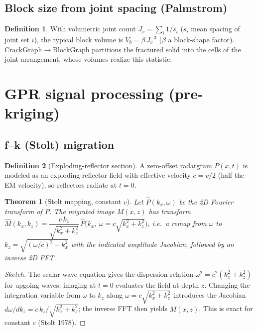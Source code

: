 \documentclass[11pt]{article}
\theoremstyle{definition}\newtheorem{definition}{Definition}[section]
\theoremstyle{plain}\newtheorem{theorem}{Theorem}[section]
\begin{document}
\subsection{Block size from joint spacing (Palmstrom)}
\begin{definition}
With volumetric joint count $J_v=\sum_i 1/s_i$ ($s_i$ mean spacing of joint set $i$), the typical block volume
is $V_b=\beta\,J_v^{-3}$ ($\beta$ a block-shape factor). $\mathrm{CrackGraph}\to\mathrm{BlockGraph}$ partitions
the fractured solid into the cells of the joint arrangement, whose volumes realize this statistic.
\end{definition}

\section{GPR signal processing (pre-kriging)}
\subsection{f--k (Stolt) migration}
\begin{definition}[Exploding-reflector section]
A zero-offset radargram $P(x,t)$ is modeled as an exploding-reflector field with effective velocity
$c=v/2$ (half the EM velocity), so reflectors radiate at $t=0$.
\end{definition}
\begin{theorem}[Stolt mapping, constant $v$]\label{thm:stolt}
Let $\hat P(k_x,\omega)$ be the 2D Fourier transform of $P$. The migrated image $M(x,z)$ has transform
$\hat M(k_x,k_z)=\dfrac{c\,k_z}{\sqrt{k_x^2+k_z^2}}\,\hat P\!\big(k_x,\ \omega=c\sqrt{k_x^2+k_z^2}\big)$, i.e.\
a remap from $\omega$ to $k_z=\sqrt{(\omega/c)^2-k_x^2}$ with the indicated amplitude Jacobian, followed by an
inverse 2D FFT.
\end{theorem}
\begin{proof}[Sketch]
The scalar wave equation gives the dispersion relation $\omega^2=c^2(k_x^2+k_z^2)$ for upgoing waves; imaging
at $t=0$ evaluates the field at depth $z$. Changing the integration variable from $\omega$ to $k_z$ along
$\omega=c\sqrt{k_x^2+k_z^2}$ introduces the Jacobian $d\omega/dk_z=c\,k_z/\sqrt{k_x^2+k_z^2}$; the inverse FFT
then yields $M(x,z)$. This is exact for constant $c$ (Stolt 1978).
\end{proof}
\end{document}
